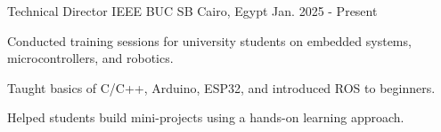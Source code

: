 

\begin{cventries}

  \cventry
    {Technical Director} %
    {IEEE BUC SB} %
    {Cairo, Egypt} %
    {Jan. 2025 - Present} %
    {
      \begin{cvitems} %
        \item {Conducted training sessions for university students on embedded systems, microcontrollers, and robotics.}
        \item {Taught basics of C/C++, Arduino, ESP32, and introduced ROS to beginners.}
        \item {Helped students build mini-projects using a hands-on learning approach.}
      \end{cvitems}
    }

\end{cventries}